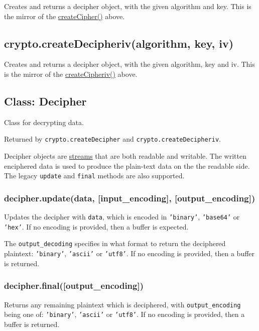 Creates and returns a decipher object, with the given algorithm and key.
This is the mirror of the
\hyperref[crypto_crypto_createcipher_algorithm_password]{createCipher()}
above.

\subsection{crypto.createDecipheriv(algorithm, key, iv)}

Creates and returns a decipher object, with the given algorithm, key and
iv. This is the mirror of the
\hyperref[crypto_crypto_createcipheriv_algorithm_key_iv]{createCipheriv()}
above.

\subsection{Class: Decipher}

Class for decrypting data.

Returned by \texttt{crypto.createDecipher} and
\texttt{crypto.createDecipheriv}.

Decipher objects are \href{stream.html}{streams} that are both readable
and writable. The written enciphered data is used to produce the
plain-text data on the the readable side. The legacy \texttt{update} and
\texttt{final} methods are also supported.

\subsubsection{decipher.update(data, {[}input\_encoding{]},
{[}output\_encoding{]})}

Updates the decipher with \texttt{data}, which is encoded in
\texttt{'binary'}, \texttt{'base64'} or \texttt{'hex'}. If no encoding
is provided, then a buffer is expected.

The \texttt{output\_decoding} specifies in what format to return the
deciphered plaintext: \texttt{'binary'}, \texttt{'ascii'} or
\texttt{'utf8'}. If no encoding is provided, then a buffer is returned.

\subsubsection{decipher.final({[}output\_encoding{]})}

Returns any remaining plaintext which is deciphered, with
\texttt{output\_encoding} being one of: \texttt{'binary'},
\texttt{'ascii'} or \texttt{'utf8'}. If no encoding is provided, then a
buffer is returned.

